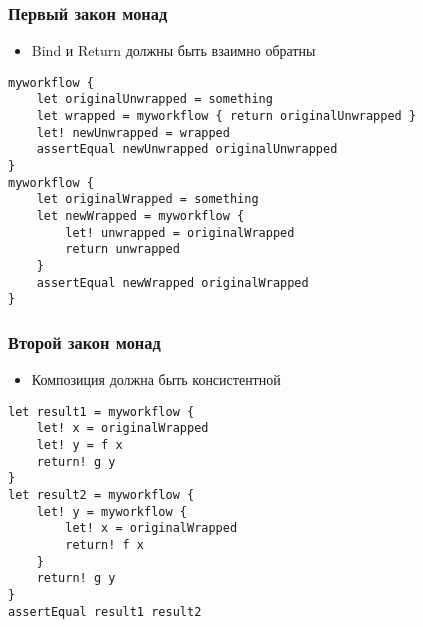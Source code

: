 \documentclass[xetex,mathserif,serif]{beamer}
\begin{document}
	\begin{frame}[fragile]
		\frametitle{Первый закон монад}
		\begin{itemize}
			\item Bind и Return должны быть взаимно обратны
		\end{itemize}
		\begin{footnotesize}
			\begin{verbatim}
myworkflow {
    let originalUnwrapped = something
    let wrapped = myworkflow { return originalUnwrapped }
    let! newUnwrapped = wrapped
    assertEqual newUnwrapped originalUnwrapped 
}
myworkflow {
    let originalWrapped = something
    let newWrapped = myworkflow { 
        let! unwrapped = originalWrapped
        return unwrapped
    }
    assertEqual newWrapped originalWrapped
}
			\end{verbatim}
		\end{footnotesize}
	\end{frame}

	\begin{frame}[fragile]
		\frametitle{Второй закон монад}
		\begin{itemize}
			\item Композиция должна быть консистентной
		\end{itemize}
		\begin{verbatim}
let result1 = myworkflow { 
    let! x = originalWrapped
    let! y = f x 
    return! g y  
}
let result2 = myworkflow { 
    let! y = myworkflow { 
        let! x = originalWrapped
        return! f x
    }
    return! g y
}
assertEqual result1 result2
		\end{verbatim}
	\end{frame}
\end{document}
